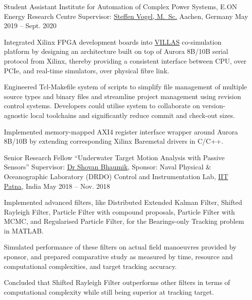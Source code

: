 \begin{cvexperience}
\cvposition
	{Student Assistant} %
	{Institute for Automation of Complex Power Systems, E.ON Energy Research Centre} %
	{Supervisor: \href{https://www.acs.eonerc.rwth-aachen.de/go/id/msul}{Steffen Vogel, M.\, Sc.}} %
	{Aachen, Germany  {\acvHeaderIconSep{}} {} } %
	{May 2019 -- Sept. 2020  {\acvHeaderIconSep{}} {} } %
	{\begin{cvitems}
		\item {Integrated Xilinx FPGA development boards into \href{https://villas.fein-aachen.org}{VILLAS} co-simulation platform by designing an architecture built on top of Aurora 8B/10B serial protocol from Xilinx, thereby providing a consistent interface between CPU, over PCIe, and real-time simulators, over physical fibre link.}
		\item {Engineered Tcl-Makefile system of scripts to simplify file management of multiple source types and binary files and streamline project management using revision control systems. Developers could utilise system to collaborate on version-agnostic local toolchains and significantly reduce commit and check-out sizes.}
		\item {Implemented memory-mapped AXI4 register interface wrapper around Aurora 8B/10B by extending corresponding Xilinx Baremetal drivers in C/C++.}
	\end{cvitems}}

\cvposition
	{Senior Research Fellow} %
	{``Underwater Target Motion Analysis with Passive Sensors''} %
	{Supervisor: \href{http://www.tutorialpoint.org/ShovanBhaumik/index.html}{Dr Shovan Bhaumik}, Sponsor: Naval Physical \& Oceanographic Laboratory (DRDO)} %
	{Control and Instrumentation Lab, \href{https://www.iitp.ac.in}{IIT Patna}, India  {\acvHeaderIconSep{}} {} } %
	{May 2018 -- Nov. 2018  {\acvHeaderIconSep{}} {} } %
	{\begin{cvitems} %
		\item {Implemented advanced filters, like Distributed Extended Kalman Filter, Shifted Rayleigh Filter, Particle Filter with compound proposals, Particle Filter with MCMC, and Regularised Particle Filter, for the Bearings-only Tracking problem in MATLAB.}
		\item {Simulated performance of these filters on actual field manoeuvres provided by sponsor, and prepared comparative study as measured by time, resource and computational complexities, and target tracking accuracy.}
		\item{Concluded that Shifted Rayleigh Filter outperforms other filters in terms of computational complexity while still being superior at tracking target.}
	\end{cvitems}}


\end{cvexperience}
